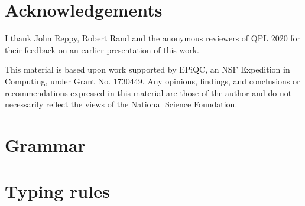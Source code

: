 \documentclass[adraft,creativecommons]{eptcs}
\theoremstyle{definition}
\theoremstyle{remark}
\begin{document}
\section*{Acknowledgements}
I thank John Reppy, Robert Rand and the anonymous reviewers of QPL 2020 for their feedback on an earlier presentation of this work.

This material is based upon work supported by EPiQC, an NSF Expedition in Computing, under Grant No. 1730449. Any opinions, findings, and conclusions or recommendations expressed in this material are those
of the author and do not necessarily reflect the views of the National Science Foundation.




\appendix

\section{Grammar}


\section{Typing rules}



% 
\end{document}
